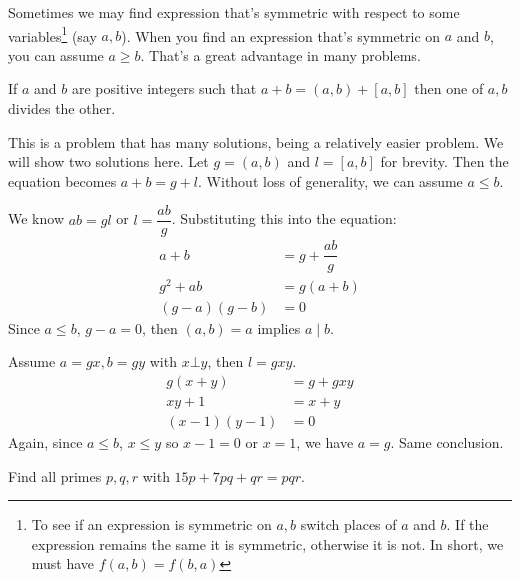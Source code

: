 \documentclass[problems.tex]{subfile}
\begin{document}
 Sometimes we may find expression that's symmetric with respect to some variables\footnote{To see if an expression is symmetric on $a,b$ switch places of $a$ and $b$. If the expression remains the same it is symmetric, otherwise it is not. In short, we must have $f(a,b)=f(b,a)$} (say $a,b$). When you find an expression that's symmetric on $a$ and $b$, you can assume $a\geq b$. That's a great advantage in many problems.

	\begin{problem}[Russia, $2000$]
		If $a$ and $b$ are positive integers such that $a+b=(a,b)+[a,b]$ then one of $a,b$ divides the other.
	\end{problem}
This is a problem that has many solutions, being a relatively easier problem. We will show two solutions here. Let $g=(a,b)$ and $l=[a,b]$ for brevity. Then the equation becomes $a+b=g+l$. Without loss of generality, we can assume $a\leq b$.
	\begin{solution}[First]
		We know $ab=gl$ or $l=\dfrac{ab}{g}$. Substituting this into the equation:
			\begin{align*}
				a+b & = g+\dfrac{ab}{g}\\
				g^2+ab & = g(a+b)\\
				(g-a)(g-b) & = 0
			\end{align*}
		Since $a\leq b$, $g-a=0$, then $(a,b)=a$ implies $a\mid b$.
	\end{solution}

	\begin{solution}[Second]
		Assume $a=gx,b=gy$ with $x\bot y$, then $l=gxy$.
			\begin{align*}
				g(x+y) & = g+gxy\\
				xy+1 & = x+y\\
				(x-1)(y-1) & = 0
			\end{align*}
		Again, since $a\leq b$, $x\leq y$ so $x-1=0$ or $x=1$, we have $a=g$. Same conclusion.
	\end{solution}

	\begin{problem}[Slovenia $2010$]
		Find all primes $p,q,r$ with $15p+7pq+qr=pqr$.
	\end{problem}
\end{document}
